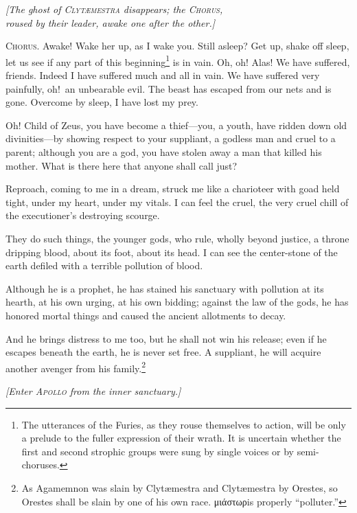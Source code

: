 \documentclass[12pt]{article}
\begin{document}
\begin{center}
\textit{[The ghost of \textsc{Clyt{\ae}mestra} disappears; the \textsc{Chorus},\\
roused by their leader, awake one after the other.]}
\end{center}

\textsc{Chorus.} Awake! Wake her up, as I wake you. Still asleep? Get up, shake off sleep, let us see if any part of this beginning\footnote{The utterances of the Furies, as they rouse themselves to action, will be only a prelude to the fuller expression of their wrath. It is uncertain whether the first and second strophic groups were sung by single voices or by semi-choruses.} is in vain. Oh, oh! Alas! We have suffered, friends. Indeed I have suffered much and all in vain. We have suffered very painfully, oh!~an unbearable evil. The beast has escaped from our nets and is gone. Overcome by sleep, I have lost my prey.

Oh! Child of Zeus, you have become a thief---you, a youth, have ridden down old divinities---by showing respect to your suppliant, a godless man and cruel to a parent; although you are a god, you have stolen away a man that killed his mother. What is there here that anyone shall call just?

Reproach, coming to me in a dream, struck me like a charioteer with goad held tight, under my heart, under my vitals. I can feel the cruel, the very cruel chill of the executioner's destroying scourge.

They do such things, the younger gods, who rule, wholly beyond justice, a throne dripping blood, about its foot, about its head. I can see the center-stone of the earth defiled with a terrible pollution of blood.

Although he is a prophet, he has stained his sanctuary with pollution at its hearth, at his own urging, at his own bidding; against the law of the gods, he has honored mortal things and caused the ancient allotments to decay.

And he brings distress to me too, but he shall not win his release; even if he escapes beneath the earth, he is never set free. A suppliant, he will acquire another avenger from his family.\footnote{As Agamemnon was slain by Clyt{\ae}mestra and Clyt{\ae}mestra by Orestes, so Orestes shall be slain by one of his own race. μιάστωρis properly ``polluter.''}

\begin{center}
\textit{[Enter \textsc{Apollo} from the inner sanctuary.]}
\end{center}
\end{document}
